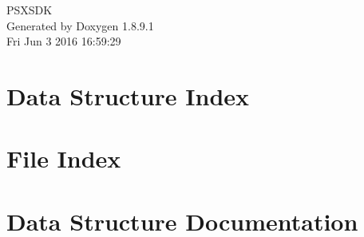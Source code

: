 \documentclass[twoside]{book}
\newcommand{\+}{\discretionary{\mbox{\scriptsize$\hookleftarrow$}}{}{}}
\newcommand{\clearemptydoublepage}{%
  \newpage{\pagestyle{empty}\cleardoublepage}%
}
\begin{document}
\hypersetup{pageanchor=false,
             bookmarks=true,
             bookmarksnumbered=true,
             pdfencoding=unicode
            }
\begin{titlepage}
\vspace*{7cm}
\begin{center}%
{\Large P\+S\+X\+S\+D\+K }\\
\vspace*{1cm}
{\large Generated by Doxygen 1.8.9.1}\\
\vspace*{0.5cm}
{\small Fri Jun 3 2016 16:59:29}\\
\end{center}
\end{titlepage}
\clearemptydoublepage
\tableofcontents
\clearemptydoublepage
{}
\hypersetup{pageanchor=true}

\chapter{Data Structure Index}

\chapter{File Index}

\chapter{Data Structure Documentation}







































\end{document}
